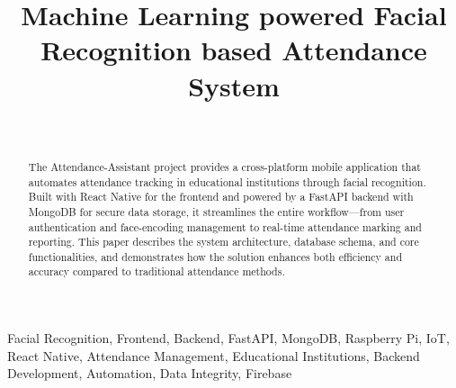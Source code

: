 \documentclass[conference]{IEEEtran}
\begin{document}
\title{Machine Learning powered Facial Recognition based Attendance System\\
}
\author{
    \\

    \and

    \and
    \and
}

\maketitle

\begin{abstract}
    The Attendance-Assistant project provides a cross-platform mobile application that automates attendance tracking in educational institutions through facial recognition. Built with React Native for the frontend and powered by a FastAPI backend with MongoDB for secure data storage, it streamlines the entire workflow—from user authentication and face-encoding management to real-time attendance marking and reporting. This paper describes the system architecture, database schema, and core functionalities, and demonstrates how the solution enhances both efficiency and accuracy compared to traditional attendance methods.
\end{abstract}
\begin{IEEEkeywords}
    Facial Recognition, Frontend, Backend, FastAPI, MongoDB, Raspberry Pi, IoT, React Native, Attendance Management, Educational Institutions, Backend Development, Automation, Data Integrity, Firebase
\end{IEEEkeywords}
\end{document}
